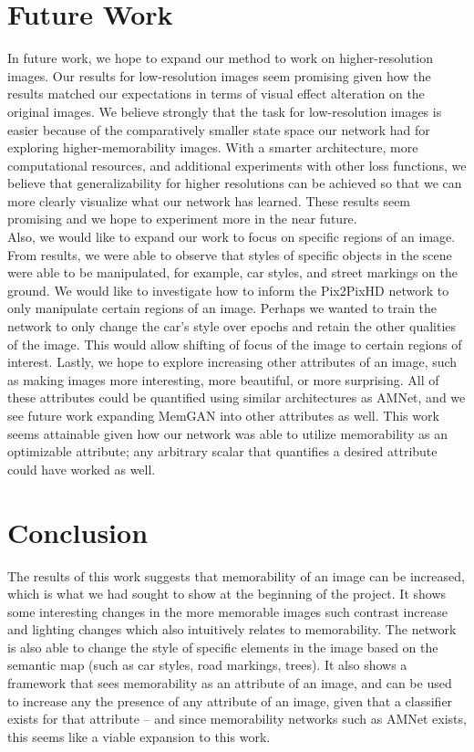 \documentclass[10pt,twocolumn,letterpaper]{article}
\begin{document}
\section{Future Work}
In future work, we hope to expand our method to work on higher-resolution images. Our results for low-resolution images seem promising given how the results matched our expectations in terms of visual effect alteration on the original images. We believe strongly that the task for low-resolution images is easier because of the comparatively smaller state space our network had for exploring higher-memorability images. With a smarter architecture, more computational resources, and additional experiments with other loss functions, we believe that generalizability for higher resolutions can be achieved so that we can more clearly visualize what our network has learned. These results seem promising and we hope to experiment more in the near future. \\
\indent Also, we would like to expand our work to focus on specific regions of an image. From results, we were able to observe that styles of specific objects in the scene were able to be manipulated, for example, car styles, and street markings on the ground. We would like to investigate how to inform the Pix2PixHD network to only manipulate certain regions of an image. Perhaps we wanted to train the network to only change the car's style over epochs and retain the other qualities of the image. This would allow shifting of focus of the image to certain regions of interest.
\indent Lastly, we hope to explore increasing other attributes of an image, such as making images more interesting, more beautiful, or more surprising. All of these attributes could be quantified using similar architectures as AMNet, and we see future work expanding MemGAN into other attributes as well. This work seems attainable given how our network was able to utilize memorability as an optimizable attribute; any arbitrary scalar that quantifies a desired attribute could have worked as well.\\


\section{Conclusion}
The results of this work suggests that memorability of an image can be increased, which is what we had sought to show at the beginning of the project. It shows some interesting changes in the more memorable images such contrast increase and lighting changes which also intuitively relates to memorability. The network is also able to change the style of specific elements in the image based on the semantic map (such as car styles, road markings, trees).  It also shows a framework that sees memorability as an attribute of an image, and can be used to increase any the presence of any attribute of an image, given that a classifier exists for that attribute -- and since memorability networks such as AMNet exists, this seems like a viable expansion to this work.
\end{document}
